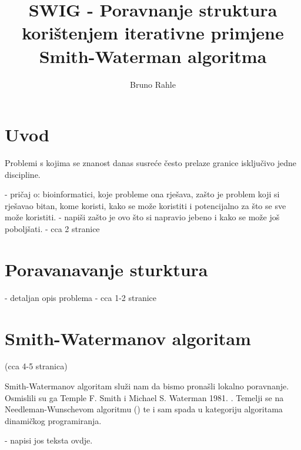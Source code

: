 \documentclass[times, utf8, zavrsni]{fer}
\begin{document}

\title{SWIG - Poravnanje struktura korištenjem iterativne primjene Smith-Waterman algoritma}

\author{Bruno Rahle}

\maketitle

\izvornik

\zahvala{}

\tableofcontents

\listoffigures

\listoftables

\chapter{Uvod}
Problemi s kojima se znanost danas susreće često prelaze granice isključivo
jedne discipline. 

- pričaj o: bioinformatici, koje probleme ona rješava, zašto je problem koji si rješavao bitan,
kome koristi, kako se može koristiti i potencijalno za što se sve može koristiti.
- napiši zašto je ovo što si napravio jebeno i kako se može još poboljšati.
- cca 2 stranice

\chapter{Poravanavanje sturktura}
- detaljan opis problema
- cca 1-2 stranice

\chapter{Smith-Watermanov algoritam}
(cca 4-5 stranica)

Smith-Watermanov algoritam služi nam da bismo pronašli lokalno poravnanje. 
Osmislili su ga Temple F. Smith i Michael S. Waterman 1981. \cite{smithwaterman1981}.
Temelji se na Needleman-Wunschevom algoritmu (\cite{needlemanwunsch1970})
te i sam spada u kategoriju algoritama dinamičkog programiranja. 

- napisi jos teksta ovdje.
\end{document}
